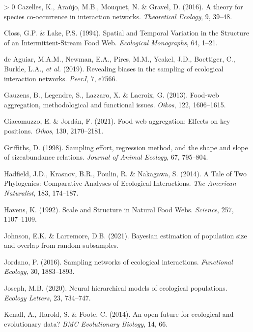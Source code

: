 \documentclass[10pt,oneside]{article}
\newlength{\cslhangindent}
\newenvironment{CSLReferences}[3] %
 {%
  \setlength{\parindent}{0pt}
  \ifodd #1 \everypar{\setlength{\hangindent}{\cslhangindent}}\ignorespaces\fi
  \ifnum #2 > 0
  \setlength{\parskip}{#2\baselineskip}
  \fi
 }%
 {}
\begin{document}
\begin{CSLReferences}{1}{0}
\leavevmode\hypertarget{ref-Cazelles2016TheSpe}{}%
Cazelles, K., Araújo, M.B., Mouquet, N. \& Gravel, D. (2016). A theory
for species co-occurrence in interaction networks. \emph{Theoretical
Ecology}, 9, 39--48.

\leavevmode\hypertarget{ref-Closs1994SpaTem}{}%
Closs, G.P. \& Lake, P.S. (1994). Spatial and Temporal Variation in the
Structure of an Intermittent-Stream Food Web. \emph{Ecological
Monographs}, 64, 1--21.

\leavevmode\hypertarget{ref-deAguiar2019RevBia}{}%
de Aguiar, M.A.M., Newman, E.A., Pires, M.M., Yeakel, J.D., Boettiger,
C., Burkle, L.A., \emph{et al.} (2019). Revealing biases in the sampling
of ecological interaction networks. \emph{PeerJ}, 7, e7566.

\leavevmode\hypertarget{ref-Gauzens2013FooAgg}{}%
Gauzens, B., Legendre, S., Lazzaro, X. \& Lacroix, G. (2013). Food-web
aggregation, methodological and functional issues. \emph{Oikos}, 122,
1606--1615.

\leavevmode\hypertarget{ref-Giacomuzzo2021FooWeb}{}%
Giacomuzzo, E. \& Jordán, F. (2021). Food web aggregation: Effects on
key positions. \emph{Oikos}, 130, 2170--2181.

\leavevmode\hypertarget{ref-Griffiths1998SamEff}{}%
Griffiths, D. (1998). Sampling effort, regression method, and the shape
and slope of sizeabundance relations. \emph{Journal of Animal Ecology},
67, 795--804.

\leavevmode\hypertarget{ref-Hadfield2014TalTwo}{}%
Hadfield, J.D., Krasnov, B.R., Poulin, R. \& Nakagawa, S. (2014). A Tale
of Two Phylogenies: Comparative Analyses of Ecological Interactions.
\emph{The American Naturalist}, 183, 174--187.

\leavevmode\hypertarget{ref-Havens1992ScaStr}{}%
Havens, K. (1992). Scale and Structure in Natural Food Webs.
\emph{Science}, 257, 1107--1109.

\leavevmode\hypertarget{ref-Johnson2021BayEst}{}%
Johnson, E.K. \& Larremore, D.B. (2021). Bayesian estimation of
population size and overlap from random subsamples.

\leavevmode\hypertarget{ref-Jordano2016SamNet}{}%
Jordano, P. (2016). Sampling networks of ecological interactions.
\emph{Functional Ecology}, 30, 1883--1893.

\leavevmode\hypertarget{ref-Joseph2020NeuHie}{}%
Joseph, M.B. (2020). Neural hierarchical models of ecological
populations. \emph{Ecology Letters}, 23, 734--747.

\leavevmode\hypertarget{ref-Kenall2014OpeFut}{}%
Kenall, A., Harold, S. \& Foote, C. (2014). An open future for
ecological and evolutionary data? \emph{BMC Evolutionary Biology}, 14,
66.


\end{CSLReferences}
\end{document}
